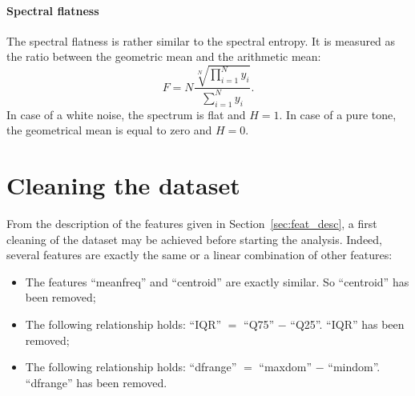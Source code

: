 \paragraph{Spectral flatness}
The spectral flatness is rather similar to the spectral entropy. It is measured as the ratio between the geometric mean and the arithmetic mean:
\begin{equation}
\label{eq:spec_flat}
	F = N \frac{\sqrt[N]{\prod\limits_{i=1}^{N} y_i}}{\sum \limits_{i=1}^{N} y_i}.
\end{equation}
In case of a white noise, the spectrum is flat and $H=1$. In case of a pure tone, the geometrical mean is equal to zero and $H=0$.

\section{Cleaning the dataset}
\label{sec_cleaning_dataset}
From the description of the features given in Section~\ref{sec:feat_desc}, a first cleaning of the dataset may be achieved before starting the analysis.
Indeed, several features are exactly the same or a linear combination of other features:
\begin{itemize}
	\item The features ``meanfreq'' and ``centroid'' are exactly similar. So ``centroid'' has been removed;
	\item The following relationship holds:  ``IQR'' $=$ ``Q75'' $-$ ``Q25''. ``IQR'' has been removed;
	\item The following relationship holds:  ``dfrange'' $=$ ``maxdom'' $-$ ``mindom''. ``dfrange'' has been removed.
\end{itemize}